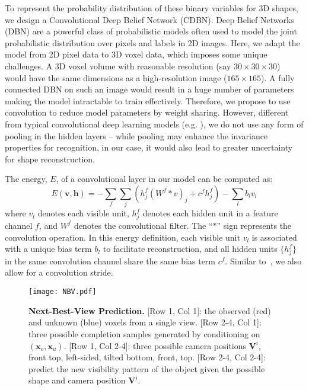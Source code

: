 \documentclass[10pt,twocolumn,letterpaper]{article}
\begin{document}
To represent the probability distribution of these binary variables for 3D shapes,
we design a Convolutional Deep Belief Network (CDBN).
Deep Belief Networks (DBN) \cite{DBN} are a powerful class of probabilistic models often used to model the joint probabilistic distribution over pixels and labels in 2D images. 
Here, we adapt the model from 2D pixel data to 3D voxel data, 
which imposes some unique challenges. A 3D voxel volume with reasonable resolution (say $30\times30\times30$) would have the same dimensions as a high-resolution image ($165\times 165$). A fully connected DBN on such an image would result in a huge number of parameters making the model intractable to train effectively. 
Therefore, we propose to use convolution to reduce model parameters by weight sharing.
However, different from typical convolutional deep learning models (e.g. \cite{CDBN}),
we do not use any form of pooling in the hidden layers --
while pooling may enhance the invariance properties for recognition, in our case, it would also lead to greater uncertainty for shape reconstruction.

The energy, $E$, of a convolutional layer in our model can be computed as:
\begin{equation}
E(\mathbf{v},\mathbf{h}) = -\sum_f \sum_j \left(h_j^f \left( W^f *  v\right)_j + c^f h_j^f  \right) - \sum_l b_lv_l
\end{equation}
where $v_l$ denotes each visible unit, $h_j^f$ denotes each hidden unit in a feature channel $f$, and $W^f$ denotes the convolutional filter. The ``$\ast$'' sign represents the convolution operation. In this energy definition, each visible unit $v_l$ is associated with a unique bias term $b_l$ to facilitate reconstruction, and all hidden units $\{h_j^f\}$ in the same convolution channel share the same bias term $c^f$. Similar to~\cite{DCNN}, we also allow for a convolution stride.


\begin{figure}[t]
\texttt{[image: NBV.pdf]}

\vspace{-2mm}
\caption{{\bf Next-Best-View Prediction.} 
[Row 1, Col 1]: the observed (red) and unknown (blue) voxels from a single view.
[Row 2-4, Col 1]: three possible completion samples generated by conditioning on $(\mathbf{x}_o,\mathbf{x}_u)$. 
[Row 1, Col 2-4]: three possible camera positions $\mathbf{V}^i$, front top, left-sided, tilted bottom, front, top. 
[Row 2-4, Col 2-4]: predict the new visibility pattern of the object given the possible shape and camera position $\mathbf{V}^i$.}
\label{fig:nextview}

\vspace{-3mm}
\end{figure}
\end{document}
